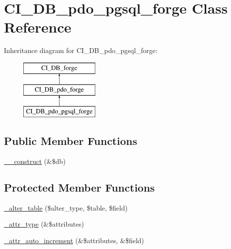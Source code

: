 \hypertarget{class_c_i___d_b__pdo__pgsql__forge}{}\section{C\+I\+\_\+\+D\+B\+\_\+pdo\+\_\+pgsql\+\_\+forge Class Reference}
\label{class_c_i___d_b__pdo__pgsql__forge}
Inheritance diagram for C\+I\+\_\+\+D\+B\+\_\+pdo\+\_\+pgsql\+\_\+forge\+:\begin{figure}[H]
\begin{center}
\leavevmode
\includegraphics[height=3.000000cm]{class_c_i___d_b__pdo__pgsql__forge}
\end{center}
\end{figure}
\subsection*{Public Member Functions}
\begin{DoxyCompactItemize}
\item 
\hyperlink{class_c_i___d_b__pdo__pgsql__forge_aaf2ef772755ec6f361d44e16cc9ffd69}{\+\_\+\+\_\+construct} (\&\$db)
\end{DoxyCompactItemize}
\subsection*{Protected Member Functions}
\begin{DoxyCompactItemize}
\item 
\hyperlink{class_c_i___d_b__pdo__pgsql__forge_a41c6cae02f2fda8b429ad0afb9509426}{\+\_\+alter\+\_\+table} (\$alter\+\_\+type, \$table, \$field)
\item 
\hyperlink{class_c_i___d_b__pdo__pgsql__forge_a8553be952084c6f7cdfff370a1d14f6b}{\+\_\+attr\+\_\+type} (\&\$attributes)
\item 
\hyperlink{class_c_i___d_b__pdo__pgsql__forge_a2a013a5932439c3c44f0dad3436525f7}{\+\_\+attr\+\_\+auto\+\_\+increment} (\&\$attributes, \&\$field)
\end{DoxyCompactItemize}
